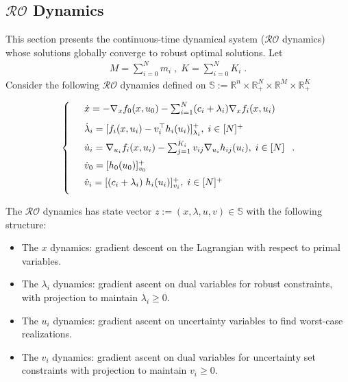 \documentclass[journal,twoside,web]{ieeecolor}
\begin{document}
\subsection*{$\mathcal{RO}$ Dynamics}

This section presents the continuous-time dynamical system ($\mathcal{RO}$ dynamics) whose solutions globally converge to robust optimal solutions. Let
\begin{align*}
M=\sum_{i=0}^{N}m_i\;,\; K=\sum_{i=0}^{N}K_i\;.
\end{align*}
Consider the following $\mathcal{RO}$ dynamics defined on $\mathbb{S}:= \mathbb{R}^n \times \mathbb{R}^N_{+} \times \mathbb{R}^M \times \mathbb{R}^K_+$\;

\begin{align} \label{pd_dynamics}
\left\{
\begin{array}{cl}
\vspace{3mm}
&\dot x=-\nabla_x f_0(x,u_0)-  \sum_{i=1}^N(c_i+\lambda_i) \nabla_x f_i(x,u_i)\\
\vspace{2mm}
&\dot \lambda_i=[f_i(x,u_i)-v_i^\top h_i(u_i)]_{\lambda_i}^+,\; i\in[N]^+\\
\vspace{2mm}
&\dot u_i=\nabla_{u_i}f_i(x,u_i)-  \sum_{j=1}^{K_i} v_{ij} \nabla_{u_i} h_{ij}(u_i),\; i\in[N]\\
\vspace{2mm}
&\dot{v}_0=[h_0(u_0)]_{v_0}^+\\
\vspace{2mm}
&\dot v_i=[(c_i+\lambda_i) \; h_i(u_i)]_{v_i}^+,\;i\in[N]^+
\end{array}\right..
\end{align}

The $\mathcal{RO}$ dynamics has state vector $z:=(x,\lambda,u,v) \in \mathbb{S}$ with the following structure:

\begin{itemize}
\item The $x$ dynamics: gradient descent on the Lagrangian with respect to primal variables.
\item The $\lambda_i$ dynamics: gradient ascent on dual variables for robust constraints, with projection to maintain $\lambda_i \geq 0$.
\item The $u_i$ dynamics: gradient ascent on uncertainty variables to find worst-case realizations.
\item The $v_i$ dynamics: gradient ascent on dual variables for uncertainty set constraints with projection to maintain $v_i \geq 0$.
\end{itemize}
\end{document}
